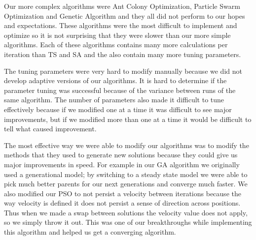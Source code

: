 \documentclass[a4paper]{article}
\begin{document}
Our more complex algorithms were Ant Colony Optimization, Particle Swarm Optimization and Genetic Algorithm and they all did not perform to our hopes and expectations. These algorithms were the most difficult to implement and optimize so it is not surprising that they were slower than our more simple algorithms. Each of these algorithms contains many more calculations per iteration than TS and SA and the also contain many more tuning parameters.

The tuning parameters were very hard to modify manually because we did not develop adaptive versions of our algorithms. It is hard to determine if the parameter tuning was successful because of the variance between runs of the same algorithm. The number of parameters also made it difficult to tune effectively because if we modified one at a time it was difficult to see major improvements, but if we modified more than one at a time it would be difficult to tell what caused improvement.

The most effective way we were able to modify our algorithms was to modify the methods that they used to generate new solutions because they could give us major improvements in speed. For example in our GA algorithm we originally used a generational model; by switching to a steady state model we were able to pick much better parents for our next generations and converge much faster. We also modified our PSO to not persist a velocity between iterations because the way velocity is defined it does not persist a sense of direction across positions. Thus when we made a swap between solutions the velocity value does not apply, so we simply throw it out. This was one of our breakthroughs while implementing this algorithm and helped us get a converging algorithm.



\printbibliography






\end{document}
